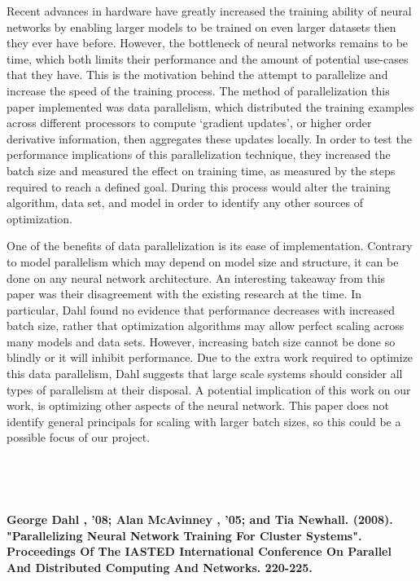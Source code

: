 \documentclass[11pt]{article}
\begin{document}
    Recent advances in hardware have greatly increased the training ability of neural networks by enabling larger models to be trained on even larger datasets then they ever have before. However, the bottleneck of neural networks remains to be time, which both limits their performance and the amount of potential use-cases that they have. This is the motivation behind the attempt to parallelize and increase the speed of the training process. The method of parallelization this paper implemented was data parallelism, which distributed the training examples across different processors to compute ‘gradient updates’, or higher order derivative information, then aggregates these updates locally. In order to test the performance implications of this parallelization technique, they  increased the batch size and measured the effect on training time, as measured by the steps required to reach a defined goal. During this process would alter the training algorithm, data set, and model in order to identify any other sources of optimization.
    
    One of the benefits of data parallelization is its ease of implementation. Contrary to model parallelism which may depend on model size and structure, it can be done on any neural network architecture. An interesting takeaway from this paper was their disagreement with the existing research at the time. In particular, Dahl found no evidence that performance decreases with increased batch size, rather that optimization algorithms may allow perfect scaling across many models and data sets. However, increasing batch size cannot be done so blindly or it will inhibit performance. Due to the extra work required to optimize this data parallelism, Dahl suggests that large scale systems should consider all types of parallelism at their disposal. A potential implication of this work on our work, is optimizing other aspects of the neural network. This paper does not identify general principals for scaling with larger batch sizes, so this could be a possible focus of our project.

\

\

\noindent \textbf{ George Dahl , '08; Alan McAvinney , '05; and Tia Newhall. (2008). "Parallelizing Neural Network Training For Cluster Systems". Proceedings Of The IASTED International Conference On Parallel And Distributed Computing And Networks. 220-225. }

\
\end{document}

